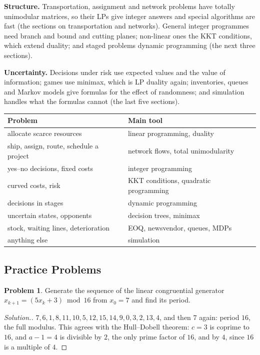 \documentclass[11pt,a4paper]{article}
\numberwithin{equation}{section}
\theoremstyle{definition}
\newtheorem{problemx}{Problem}[subsection]
\newenvironment{problem}{\begin{problemx}}{\end{problemx}}
\newenvironment{solution}
  {\renewcommand{\qedsymbol}{}\begin{proof}[\textit{Solution}.]}
  {\end{proof}}
\begin{document}
\textbf{Structure.} Transportation, assignment and network problems have totally unimodular matrices, so their LPs give integer answers and special algorithms are fast (the sections on transportation and networks). General integer programmes need branch and bound and cutting planes; non-linear ones the KKT conditions, which extend duality; and staged problems dynamic programming (the next three sections).

\textbf{Uncertainty.} Decisions under risk use expected values and the value of information; games use minimax, which is LP duality again; inventories, queues and Markov models give formulas for the effect of randomness; and simulation handles what the formulas cannot (the last five sections).

\begin{center}
\small
\begin{tabular}{ll}
\hline
\textbf{Problem} & \textbf{Main tool} \\
\hline
allocate scarce resources & linear programming, duality \\
ship, assign, route, schedule a project & network flows, total unimodularity \\
yes--no decisions, fixed costs & integer programming \\
curved costs, risk & KKT conditions, quadratic programming \\
decisions in stages & dynamic programming \\
uncertain states, opponents & decision trees, minimax \\
stock, waiting lines, deterioration & EOQ, newsvendor, queues, MDPs \\
anything else & simulation \\
\hline
\end{tabular}
\end{center}

\subsection{Practice Problems}

\begin{problem}
Generate the sequence of the linear congruential generator $x_{k + 1} = (5x_k + 3) \bmod 16$ from $x_0 = 7$ and find its period.
\end{problem}

\begin{solution}
$7, 6, 1, 8, 11, 10, 5, 12, 15, 14, 9, 0, 3, 2, 13, 4$, and then $7$ again: period $16$, the full modulus. This agrees with the Hull--Dobell theorem: $c = 3$ is coprime to $16$, and $a - 1 = 4$ is divisible by $2$, the only prime factor of $16$, and by $4$, since $16$ is a multiple of $4$.
\end{solution}
\end{document}
